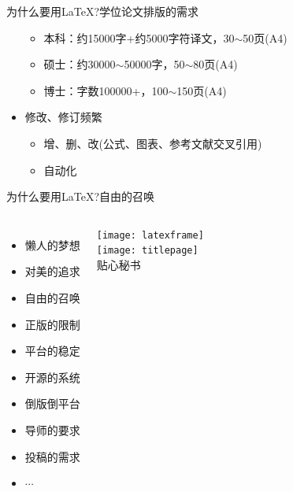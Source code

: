 \documentclass[fontset = none, xcolor=svgnames, t, aspectratio=169]{ctexbeamer}
\begin{document}
\begin{frame}{为什么要用\LaTeX?}{学位论文排版的需求}
\begin{spacing}{0.65}
\begin{itemize}
\begin{itemize}
    \item 本科：约15000字+约5000字符译文，30$\sim$50页(A4)
    \item 硕士：约30000$\sim$50000字，50$\sim$80页(A4)
    \item 博士：字数100000+，100$\sim$150页(A4)
    \end{itemize}  
  \item 修改、修订\alert{频繁}
    \begin{itemize}
    \item 增、删、改(公式、图表、参考文献交叉引用)
    \item \alert{自动化}
    \end{itemize}  
  \end{itemize}
  \end{spacing}
\end{frame}

\begin{frame}{为什么要用\LaTeX?}{自由的召唤}
  \begin{columns}[c]
    \begin{itemize} \setlength\itemsep{0.7em}
    \item \alert{懒人}的梦想
    \item 对\alert{美}的追求
    \item \alert{自由}的召唤
    \item \alert{正版}的限制
    \item 平台的\alert{稳定}
    \item \alert{开源}的系统
    \item \alert{倒版倒平台}
    \item \alert{导师}的要求
    \item \alert{投稿}的需求
    \item $\cdots$\hphantom{倒版倒a}%
    \end{itemize}
    \begin{center}
      \texttt{[image: latexframe]}\\\vfill
      \texttt{[image: titlepage]}\\%
      贴心\alert{秘书}
    \end{center}
  \end{columns}
\end{frame}
\end{document}
